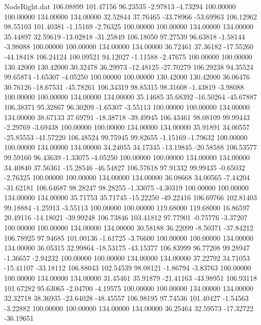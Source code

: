 \begin{filecontents}{NodeRight.dat}
 106.08899  101.47156   96.23535    -2.97813   -4.73294  100.00000  100.00000  134.00000  134.00000   32.52844   37.76465  -33.78966  -53.69963
 106.12962   98.55103  101.40381    -1.15169   -2.76325  100.00000  100.00000  134.00000  134.00000   35.44897   32.59619  -13.02818  -31.25849
 106.18050   97.27539   96.63818    -1.58144   -3.98088  100.00000  100.00000  134.00000  134.00000   36.72461   37.36182  -17.55260  -44.18418
 106.24124  100.09521   94.12027    -1.11588   -2.47675  100.00000  100.00000  130.42000  130.42000   30.32478   36.29973  -12.48125  -27.70279
 106.29238   94.35524   99.65874    -1.65307   -4.05250  100.00000  100.00000  130.42000  130.42000   36.06476   30.76126  -18.67531  -45.78261
 106.34319   98.85315   98.31608    -1.43819   -3.98088  100.00000  100.00000  134.00000  134.00000   35.14685   35.68392  -16.50264  -45.67887
 106.38371   95.32867   96.30209    -1.65307   -3.55113  100.00000  100.00000  134.00000  134.00000   38.67133   37.69791  -18.38718  -39.49945
 106.43461   98.08109   99.99443    -2.29769   -3.69438  100.00000  100.00000  134.00000  134.00000   35.91891   34.00557  -25.85553  -41.57220
 106.48524   99.75945   99.82655    -1.15169   -1.79632  100.00000  100.00000  134.00000  134.00000   34.24055   34.17345  -13.19845  -20.58588
 106.53577   99.59160   96.43639    -1.33075   -4.05250  100.00000  100.00000  134.00000  134.00000   34.40840   37.56361  -15.28546  -46.54827
 106.57618   97.91332   99.99435    -0.65032   -2.76325  100.00000  100.00000  134.00000  134.00000   36.08668   34.00565   -7.44204  -31.62181
 106.64687   98.28247   98.28255    -1.33075   -4.30319  100.00000  100.00000  134.00000  134.00000   35.71753   35.71745  -15.22250  -49.22416
 106.69766  102.81403   99.18884    -1.25913   -3.55113  100.00000  100.00000  119.68000  119.68000   16.86597   20.49116  -14.18021  -39.99248
 106.73846  103.41812   97.77901    -0.75776   -3.37207  100.00000  100.00000  134.00000  134.00000   30.58188   36.22099   -8.50371  -37.84212
 106.78925   97.94685  101.00136    -1.61725   -3.76600  100.00000  100.00000  134.00000  134.00000   36.05315   32.99864  -18.53175  -43.15377
 106.83999   96.77208   99.28947    -1.36657   -2.94232  100.00000  100.00000  134.00000  134.00000   37.22792   34.71053  -15.41107  -33.18112
 106.88043  102.54539   98.08121    -1.86794   -3.83763  100.00000  100.00000  134.00000  134.00000   31.45461   35.91879  -21.41163  -43.98951
 106.93118  101.67282   95.63065    -2.04700   -4.19575  100.00000  100.00000  134.00000  134.00000   32.32718   38.36935  -23.64028  -48.45557
 106.98195   97.74536  101.40427    -1.54563   -3.22882  100.00000  100.00000  134.00000  134.00000   36.25464   32.59573  -17.32722  -36.19651

\end{filecontents}
